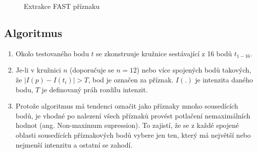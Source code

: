 	\begin{figure}[htp] 
		\caption{Extrakce FAST příznaku} 	\label{fast_corner}
	\end{figure}
	
	\subsection{Algoritmus}
	
		\begin{enumerate}
			\item Okolo testovaného bodu $t$ se zkonstruuje kružnice sestávající z 16 bodů $t_{1-16}$. 
			\item Je-li v kružnici $n$ (doporučuje se $n=12$) nebo více spojených bodů takových, že $\lvert I(p) - I(t_i) \rvert > T$, bod je označen za příznak. $I(.)$ je intenzita daného bodu, $T$ je definovaný práh rozdílu intenzit.
			\item Protože algoritmus má tendenci označit jako příznaky mnoho sousedících bodů, je vhodné po nalezení všech příznaků provést potlačení nemaximálních hodnot (ang. Non-maximum supression). To zajistí, že se z každé spojené oblasti sousedících příznakových bodů vybere jen ten, který má největší nebo nejmenší intenzitu a ostatní se zahodí.
		\end{enumerate}
		
